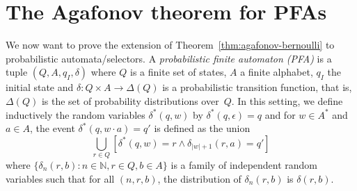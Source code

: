 \documentclass[11pt]{article}
\newtheorem{lemma}{Lemma}
\newcommand{\G}{\mathcal{G}}
\newcommand{\emptystr}{\epsilon}
\DeclareMathOperator{\capital}{Capital}
\begin{document}
%

%
%
%




\section{The Agafonov theorem for PFAs}

We now want to prove the extension of Theorem~\ref{thm:agafonov-bernoulli} to probabilistic automata/selectors. A \emph{probabilistic finite automaton (PFA)} is a tuple $(Q,A,q_I,\delta)$ where $Q$ is a finite set of states, $A$ a finite alphabet, $q_I$ the initial state and $\delta: Q \times 	A \rightarrow \Delta(Q)$ is a probabilistic transition function, that is, $\Delta(Q)$ is the set of probability distributions over~$Q$. In this setting, we define inductively the random variables $\delta^*(q,w)$ by $\delta^*(q,\emptystr)=q$ and for $w \in A^*$ and $a \in A$, the event $\delta^*(q,w \cdot a) = q'$ is defined as the union
\[
\bigcup_{r \in Q} \left[ \delta^*(q,w)=r \wedge \delta_{|w|+1}(r,a)=q' \right]
\]
where $\{\delta_n(r,b) : n \in \mathbb{N}, r \in Q, b \in A\}$ is a family of independent random variables such that for all $(n,r,b)$, the distribution of $\delta_n(r,b)$ is $\delta(r,b)$. \\
\end{document}
